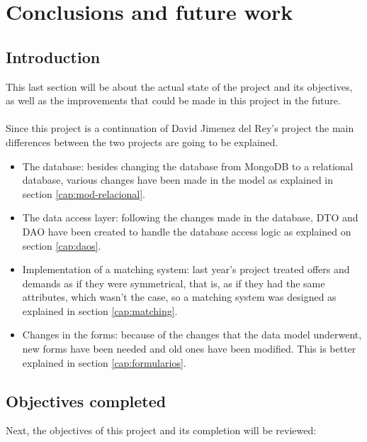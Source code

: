 \documentclass[11pt]{book}
\begin{document}
	
	\chapter{Conclusions and future work}
	\section{Introduction}
	This last section will be about the actual state of the project and its objectives, as well as the improvements that could be made in this project in the future.\\\\
	Since this project is a continuation of David Jimenez del Rey's project the main differences between the two projects are going to be explained.
	\begin{itemize}
		\item The database: besides changing the database from MongoDB to a relational database, various changes have been made in the model as explained in section \ref{cap:mod-relacional}.
		\item The data access layer: following the changes made in the database, DTO and DAO have been created to handle the database access logic as explained on section \ref{cap:daos}.
		\item Implementation of a matching system: last year's project treated offers and demands as if they were symmetrical, that is, as if they had the same attributes, which wasn't the case, so a matching system was designed as explained in section \ref{cap:matching}.
		\item Changes in the forms: because of the changes that the data model underwent, new forms have been needed and old ones have been modified. This is better explained in section \ref{cap:formularios}.
	\end{itemize}
	
	\section{Objectives completed}
	Next, the objectives of this project and its completion will be reviewed:
	
\end{document}
